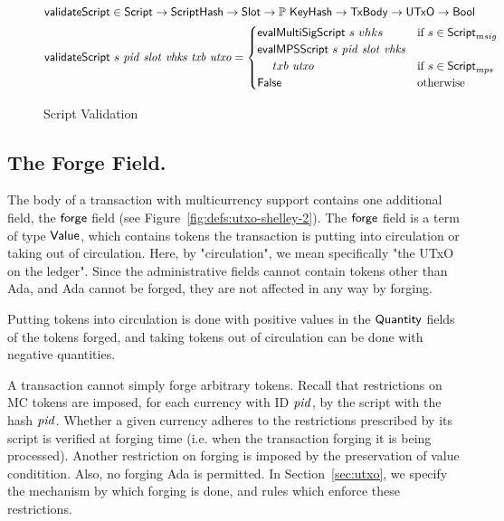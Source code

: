 \begin{figure*}[htb]
    \begin{align*}
      \mathsf{validateScript} & \in\mathsf{Script}\to\mathsf{ScriptHash}\to\mathsf{Slot}\to
      \mathbb{P}~\mathsf{KeyHash}\to\mathsf{TxBody}\to\mathsf{UTxO}\to\mathsf{Bool} \\
      \mathsf{validateScript} & ~s~\mathit{pid}~\mathit{slot}~\mathit{vhks}
       ~\mathit{txb}~\mathit{utxo} =
                             \begin{cases}
                               \mathsf{evalMultiSigScript}~s~vhks & \text{if}~s \in\mathsf{Script}_{msig} \\
                               \mathsf{evalMPSScript}~s~\mathit{pid}~\mathit{slot}~\mathit{vhks} \\
                                ~~~~txb~\mathit{utxo} & \text{if}~s \in\mathsf{Script}_{mps} \\
                               \mathsf{False} & \text{otherwise}
                             \end{cases} \\
    \end{align*}
  \caption{Script Validation}
  \label{fig:defs:tx-mc-valid}
\end{figure*}

\subsection*{The Forge Field.}

The body of a transaction with multicurrency support contains one additional
field, the $\mathsf{forge}$ field (see Figure~\ref{fig:defs:utxo-shelley-2}).
The $\mathsf{forge}$ field is a term of type $\mathsf{Value}$, which contains
tokens the transaction is putting into circulation or taking out of
circulation. Here, by "circulation", we mean specifically "the UTxO on the
ledger". Since the administrative fields cannot contain tokens other than Ada,
and Ada cannot be forged, they are not affected in any way by forging.

Putting tokens into circulation is done with positive values in the $\mathsf{Quantity}$
fields of the tokens forged, and taking tokens out of circulation can be done
with negative quantities.

A transaction cannot simply forge arbitrary tokens. Recall that restrictions on
MC tokens are imposed, for each currency with ID $\mathit{pid}$, by the script
with the hash $\mathit{pid}$. Whether a given currency adheres to the restrictions
prescribed by its script is verified at forging time (i.e. when the transaction
forging it is being processed). Another restriction on forging is imposed by
the preservation of value conditition. Also, no forging Ada
is permitted. In Section~\ref{sec:utxo}, we specify the mechanism by which
forging is done, and rules which enforce these restrictions.

